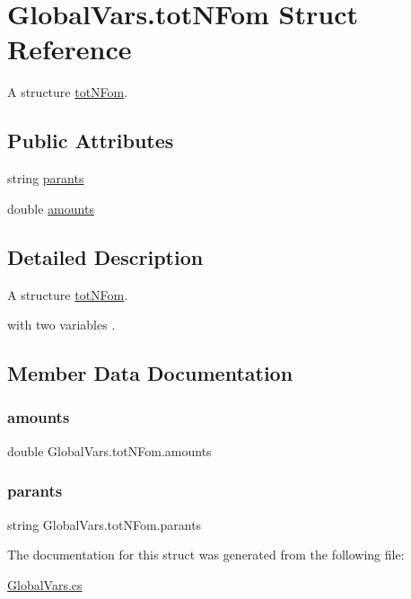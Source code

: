 \hypertarget{struct_global_vars_1_1tot_n_fom}{}\section{Global\+Vars.\+tot\+N\+Fom Struct Reference}
\label{struct_global_vars_1_1tot_n_fom}


A structure \mbox{\hyperlink{struct_global_vars_1_1tot_n_fom}{tot\+N\+Fom}}.  


\subsection*{Public Attributes}
\begin{DoxyCompactItemize}
\item 
string \mbox{\hyperlink{struct_global_vars_1_1tot_n_fom_afc083b03e428bdece54c2231920f3cdd}{parants}}
\item 
double \mbox{\hyperlink{struct_global_vars_1_1tot_n_fom_a6f74d5f693087dbf383f90028bfc748a}{amounts}}
\end{DoxyCompactItemize}


\subsection{Detailed Description}
A structure \mbox{\hyperlink{struct_global_vars_1_1tot_n_fom}{tot\+N\+Fom}}. 

with two variables . 

\subsection{Member Data Documentation}
\mbox{\label{struct_global_vars_1_1tot_n_fom_a6f74d5f693087dbf383f90028bfc748a}} 
\subsubsection{\texorpdfstring{amounts}{amounts}}
{\footnotesize\ttfamily double Global\+Vars.\+tot\+N\+Fom.\+amounts}

\mbox{\label{struct_global_vars_1_1tot_n_fom_afc083b03e428bdece54c2231920f3cdd}} 
\subsubsection{\texorpdfstring{parants}{parants}}
{\footnotesize\ttfamily string Global\+Vars.\+tot\+N\+Fom.\+parants}



The documentation for this struct was generated from the following file\+:\begin{DoxyCompactItemize}
\item 
\mbox{\hyperlink{_global_vars_8cs}{Global\+Vars.\+cs}}\end{DoxyCompactItemize}
